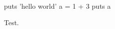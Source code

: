 \documentclass{article}
\begin{document}
\begin{rbtex}
puts 'hello world'
a = 1 + 3
puts a
\end{rbtex}
Test.
\end{document}
